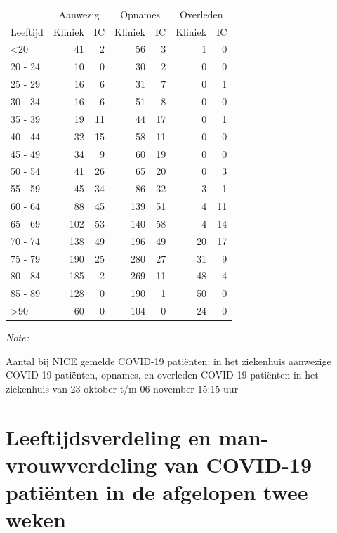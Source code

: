 \documentclass[
  english,
  man,floatsintext]{apa6}
\begin{document}
\begin{table}
\centering\begingroup\fontsize{10}{12}\selectfont

\begin{threeparttable}
\begin{tabular}{lrrrrrr}
\toprule
\multicolumn{1}{c}{ } & \multicolumn{2}{c}{Aanwezig} & \multicolumn{2}{c}{Opnames} & \multicolumn{2}{c}{Overleden} \\
\cmidrule(l{3pt}r{3pt}){2-3} \cmidrule(l{3pt}r{3pt}){4-5} \cmidrule(l{3pt}r{3pt}){6-7}
Leeftijd & Kliniek & IC & Kliniek & IC & Kliniek & IC\\
\midrule
<20 & 41 & 2 & 56 & 3 & 1 & 0\\
20 - 24 & 10 & 0 & 30 & 2 & 0 & 0\\
25 - 29 & 16 & 6 & 31 & 7 & 0 & 1\\
30 - 34 & 16 & 6 & 51 & 8 & 0 & 0\\
35 - 39 & 19 & 11 & 44 & 17 & 0 & 1\\
40 - 44 & 32 & 15 & 58 & 11 & 0 & 0\\
45 - 49 & 34 & 9 & 60 & 19 & 0 & 0\\
50 - 54 & 41 & 26 & 65 & 20 & 0 & 3\\
55 - 59 & 45 & 34 & 86 & 32 & 3 & 1\\
60 - 64 & 88 & 45 & 139 & 51 & 4 & 11\\
65 - 69 & 102 & 53 & 140 & 58 & 4 & 14\\
70 - 74 & 138 & 49 & 196 & 49 & 20 & 17\\
75 - 79 & 190 & 25 & 280 & 27 & 31 & 9\\
80 - 84 & 185 & 2 & 269 & 11 & 48 & 4\\
85 - 89 & 128 & 0 & 190 & 1 & 50 & 0\\
>90 & 60 & 0 & 104 & 0 & 24 & 0\\
\bottomrule
\end{tabular}
\begin{tablenotes}
\item \textit{Note: } 
\item Aantal bij NICE gemelde COVID-19 patiënten: in het ziekenhuis aanwezige COVID-19 patiënten, opnames, en overleden COVID-19 patiënten in het ziekenhuis van 23 oktober t/m 06 november 15:15 uur
\end{tablenotes}
\end{threeparttable}
\endgroup{}
\end{table}

\newpage

\hypertarget{leeftijdsverdeling-en-man-vrouwverdeling-van-covid-19-patiuxebnten-in-de-afgelopen-twee-weken}{%
\section{Leeftijdsverdeling en man-vrouwverdeling van COVID-19 patiënten in de afgelopen twee weken}\label{leeftijdsverdeling-en-man-vrouwverdeling-van-covid-19-patiuxebnten-in-de-afgelopen-twee-weken}}
\end{document}
